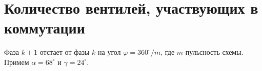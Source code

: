 \documentclass{article}
\begin{document}

\section{Количество вентилей, участвующих в коммутации}

\newcommand{\PI}{3.14159265}
\newcommand{\Fi}{(30/180)*3.14159265} %

Фаза $k+1$ отстает от фазы $k$ на угол $\varphi=360^\circ/m$, где $m$-пульсность схемы.  Примем $\alpha=68^\circ$ и $\gamma=24^\circ$.

\newcommand{\alfa}{(68/180)*3.1415}  %
\newcommand{\gammaa}{(25/180)*3.14} %


\newcommand{\x}{1.83}

\newcommand{\Fii}{\Fi} %

\newcommand{\xI}{1.83+(30/180)*3.14159265}

\newcommand{\Fiii}{\Fi} %

\newcommand{\xII}{1.83+2*(30/180)*3.14159265}
\end{document}
